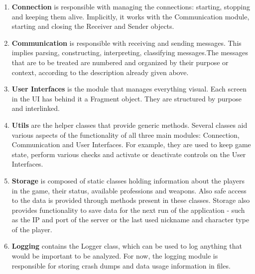 \begin{enumerate}
  \item \textbf{Connection} is responsible with managing the connections:
  starting, stopping and keeping them alive. Implicitly, it works with the
  Communication module, starting and closing the Receiver and Sender objects.
  
  \item \textbf{Communication} is responsible with receiving and
  sending messages. This implies parsing, constructing,
  interpreting, classifying messages.The messages that are to be treated are
  numbered and organized by their purpose or context, according to the
  description already given above.
  
  \item \textbf{User Interfaces} is the module that manages everything
  visual. Each screen in the UI has behind it a Fragment object. They are
  structured by purpose and interlinked. 
  
  \item \textbf{Utils} are the helper classes that provide generic methods.
  Several classes aid various aspects of the functionality of all three main
  modules: Connection, Communication and User Interfaces. For example, they are
  used to keep game state, perform various checks and activate or deactivate
  controls on the User Interfaces.
  
  \item \textbf{Storage} is composed of static classes holding
  information about the players in the game, their status, available professions
  and weapons. Also safe access to the data is provided through methods present
  in these classes. Storage also provides functionality to save data for the
  next run of the application - such as the IP and port of the server or the
  last used nickname and character type of the player. 
  
  \item \textbf{Logging} contains the Logger class, which can be used to log
  anything that would be important to be analyzed. For now, the logging module
  is responsible for storing crash dumps and data usage information in files.
\end{enumerate}

